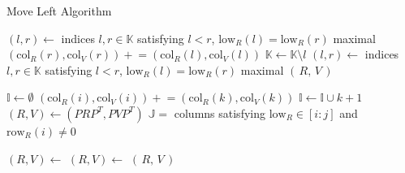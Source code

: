 \documentclass[sn-mathphys]{sn-jnl}
\begin{document}
\begin{algorithm}[!htb]
	\caption{Move Left Algorithm}\label{alg:ml}
    \begin{algorithmic}[1]
            \State $(l, r) \gets $ indices $l, r \in \mathbb{K}$ satisfying $l < r$, $\mathrm{low}_R(l) = \mathrm{low}_R(r)$ maximal 
            	\State $(\mathrm{col}_R(r), \mathrm{col}_V(r)) \mathrel{+}= (\mathrm{col}_R(l), \mathrm{col}_V(l))$
            	\State $\mathbb{K} \gets \mathbb{K} \setminus l$
            	\State $(l, r) \gets $ indices $l, r \in \mathbb{K}$ satisfying $l < r$, $\mathrm{low}_R(l) = \mathrm{low}_R(r)$ maximal
            \EndWhile
        	\State \Return $(\, R, \, V \, )$
        \EndFunction
    \end{algorithmic}
    
    \begin{algorithmic}[1]
        	\State $\mathbb{I} \gets \emptyset$
            	\State $(\mathrm{col}_R(i), \mathrm{col}_V(i)) \mathrel{+}= (\mathrm{col}_R(k), \mathrm{col}_V(k))$
            	\State $\mathbb{I} \gets \mathbb{I} \cup k + 1 $
            \EndWhile
            \State $(R, V) \gets (P R P^T, P V P^T)$
            \State $\mathbb{J} = $ columns satisfying $\mathrm{low}_R \in [i:j]$ and $\mathrm{row}_R(i) \neq 0$ %

            \State $(R, V) \gets$ 
            \State $(R, V) \gets$ 
			\State \Return $(\, R, \, V\,)$
        \EndFunction
    \end{algorithmic}
\end{algorithm}
\end{document}
